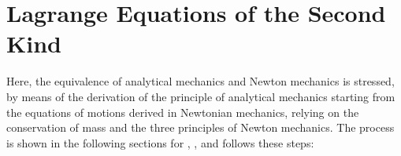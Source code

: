 \documentclass[letterpaper,10pt,english]{jupyterBook}
\begin{document}
\section{Lagrange Equations of the Second Kind}
\label{\detokenize{ch/lagrange-ii-type:lagrange-equations-of-the-second-kind}}\label{\detokenize{ch/lagrange-ii-type:classical-mechanics-lagrange-ii-type}}\label{\detokenize{ch/lagrange-ii-type::doc}}
\sphinxAtStartPar
Here, the equivalence of analytical mechanics and Newton mechanics is stressed, by means of the derivation of the principle of analytical mechanics starting from the equations of motions derived in Newtonian mechanics, relying on the conservation of mass and the three principles of Newton mechanics. The process is shown in the following sections for {\hyperref[\detokenize{ch/lagrange-point:classical-mechanics-lagrange-point}]{}}, {\hyperref[\detokenize{ch/lagrange-points:classical-mechanics-lagrange-points}]{}}, {\hyperref[\detokenize{ch/lagrange-rigid-body:classical-mechanics-lagrange-rigid}]{}} and follows these steps:
\end{document}

